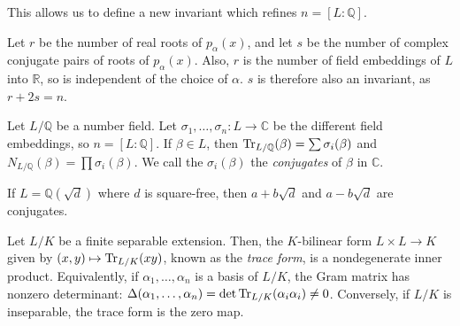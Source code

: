 This allows us to define a new invariant which refines \( n = [L:\mathbb Q] \).
\begin{definition}
    Let \( r \) be the number of real roots of \( p_\alpha(x) \), and let \( s \) be the number of complex conjugate pairs of roots of \( p_\alpha(x) \).
    Also, \( r \) is the number of field embeddings of \( L \) into \( \mathbb R \), so is independent of the choice of \( \alpha \).
    \( s \) is therefore also an invariant, as \( r + 2s = n \).
\end{definition}
\begin{lemma}
    Let \( L / \mathbb Q \) be a number field.
    Let \( \sigma_1, \dots, \sigma_n \colon L \to \mathbb C \) be the different field embeddings, so \( n = [L:\mathbb Q]\).
    If \( \beta \in L \), then \( \Tr_{L/\mathbb Q}(\beta) = \sum \sigma_i(\beta) \) and \( N_{L/\mathbb Q}(\beta) = \prod \sigma_i(\beta) \).
    We call the \( \sigma_i(\beta) \) the \emph{conjugates} of \( \beta \) in \( \mathbb C \).
\end{lemma}
\begin{example}
    If \( L = \mathbb Q(\sqrt d) \) where \( d \) is square-free, then \( a + b\sqrt d \) and \( a - b\sqrt d \) are conjugates.
\end{example}
\begin{proposition}
    Let \( L / K \) be a finite separable extension.
    Then, the \( K \)-bilinear form \( L \times L \to K \) given by \( (x, y) \mapsto \Tr_{L/K}(xy) \), known as the \emph{trace form}, is a nondegenerate inner product.
    Equivalently, if \( \alpha_1, \dots, \alpha_n \) is a basis of \( L / K \), the Gram matrix has nonzero determinant: \( \Delta(\alpha_1, \dots, \alpha_n) = \det \Tr_{L/K}(\alpha_i \alpha_i) \neq 0 \).
    Conversely, if \( L / K \) is inseparable, the trace form is the zero map.
\end{proposition}
